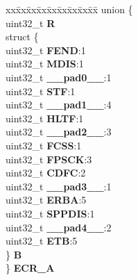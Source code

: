 \begin{DoxyCompactItemize}
\begin{tabbing}
\end{tabbing}\item 
\mbox{\label{structETPU__tag_a29842d74a5282c1134ebfe0ee52d4741}} 
\begin{tabbing}
xx\=xx\=xx\=xx\=xx\=xx\=xx\=xx\=xx\=\kill
union \{\\
\>uint32\_t {\bfseries R}\\
\>struct \{\\
\>\>uint32\_t {\bfseries FEND}:1\\
\>\>uint32\_t {\bfseries MDIS}:1\\
\>\>uint32\_t {\bfseries \_\_pad0\_\_}:1\\
\>\>uint32\_t {\bfseries STF}:1\\
\>\>uint32\_t {\bfseries \_\_pad1\_\_}:4\\
\>\>uint32\_t {\bfseries HLTF}:1\\
\>\>uint32\_t {\bfseries \_\_pad2\_\_}:3\\
\>\>uint32\_t {\bfseries FCSS}:1\\
\>\>uint32\_t {\bfseries FPSCK}:3\\
\>\>uint32\_t {\bfseries CDFC}:2\\
\>\>uint32\_t {\bfseries \_\_pad3\_\_}:1\\
\>\>uint32\_t {\bfseries ERBA}:5\\
\>\>uint32\_t {\bfseries SPPDIS}:1\\
\>\>uint32\_t {\bfseries \_\_pad4\_\_}:2\\
\>\>uint32\_t {\bfseries ETB}:5\\
\>\} {\bfseries B}\\
\} {\bfseries ECR\_A}\\


\end{tabbing}
\end{DoxyCompactItemize}
